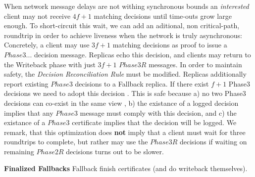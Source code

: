 When network message delays are not withing synchronous bounds an \textit{interested} client may not receive $4f+1$ matching decisions until time-outs grow large enough. To short-circuit this wait, we can add an aditional, non critical-path, roundtrip in order to achieve liveness when the network is truly asynchronous:  
Concretely, a client may use $3f+1$ matching decisions as proof to issue a $Phase3 ...$ decision message. Replicas echo this decision, and clients may return to the Writeback phase with just $3f+1$ $Phase3R$ messages. In order to maintain safety, the \textit{Decision Reconciliation Rule} must be modified. Replicas additionally report existing $Phase3$ decisions to a Fallback replica. If there exist $f+1$ Phase3 decisions we need to adopt this decision . This is safe because a) no two Phase3 decisions can co-exist in the same view , b) the existance of a logged decision implies that any $Phase3$ message must comply with this decision, and c) the existance of a $Phase3$ certificate implies that the decision will be logged. 
We remark, that this optimization does \textbf{not} imply that a client must wait for three roundtrips to complete, but rather may use the $Phase3R$ decisions if waiting on remaining $Phase2R$ decisions turns out to be slower.

\iffalse
\textbf{Finalized Fallbacks}
Fallback finish certificates (and do writeback themselves).\\






